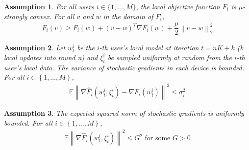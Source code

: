 \documentclass{article}
\newtheorem{assumption}{Assumption}
\newcommand\norm[1]{\left\lVert#1\right\rVert}
\begin{document}
\begin{assumption}
\label{ass: convex}
    For all users $i \in \{1, \ldots, M\}$, the local objective function $F_i$ is $\mu$-strongly convex. For all $v$ and $w$ in the domain of $F_i$, 
    \begin{align*}
        F_i(v) \geq F_i(w) + (v - w)^T \nabla F_i(w) + \dfrac{\mu}{2} \norm{v - w}_2^2 
    \end{align*}
\end{assumption}

\begin{assumption}
\label{ass: grad-var}
    Let $w_t^i$ be the $i$-th user's local model at iteration $t = nK + k$ (k local updates into round n) and $\xi_t^i$ be sampled uniformly at random from the $i$-th user's local data.
    The variance of stochastic gradients in each device is bounded. For all $i \in \left\{ 1, \ldots, M \right\}$, 
    \begin{align*}
        \mathbb{E} \norm{\nabla \hat F_i \left( w_t^i, \xi_t^i \right) - \nabla F_i \left( w_t^i \right)}^2 \leq \sigma_i^2
    \end{align*}

\end{assumption}

\begin{assumption}
\label{ass: grad-norm}
    The expected squared norm of stochastic gradients is uniformly bounded. For all $i \in \left\{ 1, \ldots, M \right\}$, 
    \begin{align*}
        \mathbb{E} \norm{\nabla \hat F_i \left(w_t^i, \xi_t^i \right)}^2 \leq G^2 \textrm{ for some } G > 0
    \end{align*}
\end{assumption}
\end{document}
